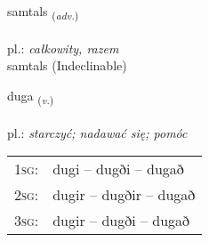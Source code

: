 \documentclass[frontgrid, backgrid]{flacards}\usepackage[]{graphicx}\usepackage[]{xcolor}
\begin{document}

\renewcommand{\flhead}{\vskip5pt \fboxsep=0pt {\small\bfseries\footnotesize Atviksorð | Adverb}}
\renewcommand{\fcfoot}{\vskip5pt \fboxsep=0pt \hspace{2pt}{\small\bfseries\footnotesize 2K}}

\renewcommand{\blhead}{\vskip5pt {\small\bfseries\footnotesize Atviksorð | Adverb }}
\renewcommand{\bcfoot}{\vskip5pt \hspace{2pt}{\small\bfseries\footnotesize 2K}}


{samtals \small{\textsubscript{(\textit{adv.})}} \\[1ex]
\textphonetic{[samtʰals]} \\
pl.: \emph{całkowity, razem} \\  [2ex]
samtals (Indeclinable)}

\renewcommand{\flhead}{\vskip5pt \fboxsep=0pt {\small\bfseries\footnotesize Sagnorð | Verb}}
\renewcommand{\fcfoot}{\vskip5pt \fboxsep=0pt \hspace{2pt}{\small\bfseries\footnotesize 2K}}

\renewcommand{\blhead}{\vskip5pt {\small\bfseries\footnotesize Sagnorð | Verb }}
\renewcommand{\bcfoot}{\vskip5pt \hspace{2pt}{\small\bfseries\footnotesize 2K}}


{duga \small{\textsubscript{(\textit{v.})}} \\[1ex] %
\textphonetic{[tʏːɣa]} \\
pl.: \emph{starczyć; nadawać się; pomóc} \\  [2ex]
\renewcommand*{\arraystretch}{0.8}
\begin{tabular}{p{1cm}l}
\textsc{1sg}: & dugi -- dugði -- dugað \\ 
\textsc{2sg}: & dugir -- dugðir -- dugað \\ 
\textsc{3sg}: & dugir -- dugði -- dugað \\ 
\end{tabular}
}
\end{document}
